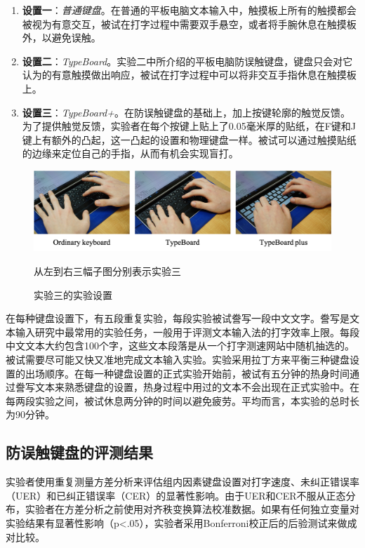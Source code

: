 \begin{enumerate}
	\item \textbf{设置一}：\emph{普通键盘}。在普通的平板电脑文本输入中，触摸板上所有的触摸都会被视为有意交互，被试在打字过程中需要双手悬空，或者将手腕休息在触摸板外，以避免误触。
	\item \textbf{设置二}：\emph{TypeBoard}。实验二中所介绍的平板电脑防误触键盘，键盘只会对它认为的有意触摸做出响应，被试在打字过程中可以将非交互手指休息在触摸板上。
	\item \textbf{设置三}：\emph{TypeBoard+}。在防误触键盘的基础上，加上按键轮廓的触觉反馈。为了提供触觉反馈，实验者在每个按键上贴上了0.05毫米厚的贴纸，在F键和J键上有额外的凸起，这一凸起的设置和物理键盘一样。被试可以通过触摸贴纸的边缘来定位自己的手指，从而有机会实现盲打。
\end{enumerate}

\begin{figure}[!tbh]
	\includegraphics[width=1.0\linewidth]{figures/TypeBoard_study3_illu.png}
	\centering
	\caption*{从左到右三幅子图分别表示实验三}
	\caption{实验三的实验设置}
	\label{fig:TypeBoard_study3_illu}
\end{figure}

在每种键盘设置下，有五段重复实验，每段实验被试誊写一段中文文字。誊写是文本输入研究中最常用的实验任务\cite{2003-Metrics, mackenzie2003phrase, 2017-Word}，一般用于评测文本输入法的打字效率上限。每段中文文本大约包含100个字，这些文本段落是从一个打字测速网站\cite{Website-Typing}中随机抽选的。被试需要尽可能又快又准地完成文本输入实验。实验采用拉丁方来平衡三种键盘设置的出场顺序。在每一种键盘设置的正式实验开始前，被试有五分钟的热身时间通过誊写文本来熟悉键盘的设置，热身过程中用过的文本不会出现在正式实验中。在每两段实验之间，被试休息两分钟的时间以避免疲劳。平均而言，本实验的总时长为90分钟。

\subsection{防误触键盘的评测结果}

实验者使用重复测量方差分析来评估组内因素键盘设置对打字速度、未纠正错误率（UER）和已纠正错误率（CER）的显著性影响。由于UER和CER不服从正态分布，实验者在方差分析之前使用对齐秩变换算法\cite{2011-Aligned}校准数据。如果有任何独立变量对实验结果有显著性影响（p<.05），实验者采用Bonferroni校正后的后验测试来做成对比较。

